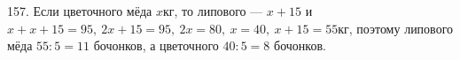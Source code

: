 157. Если цветочного мёда $x$кг, то липового --- $x+15$ и $x+x+15=95,\ 2x+15=95,\ 2x=80,\ x=40,\ x+15=55$кг, поэтому липового мёда $55:5=11$ бочонков, а цветочного $40:5=8$ бочонков.\\
